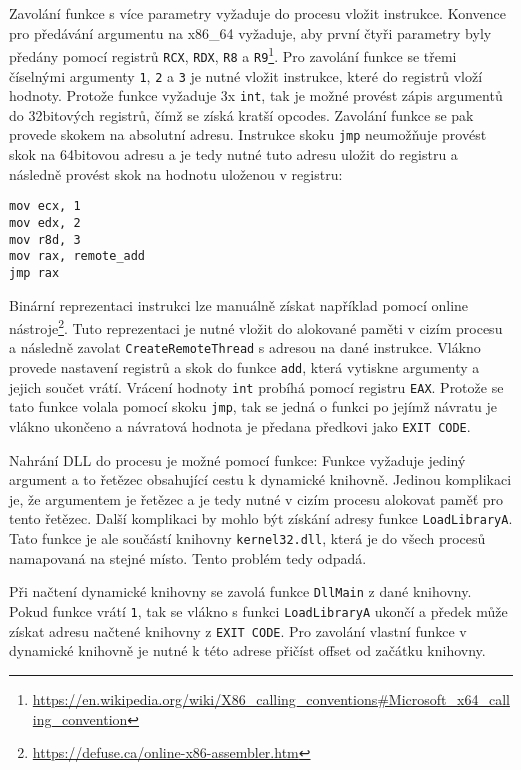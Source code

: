 \documentclass[12pt,a4paper]{article}
\begin{document}
Zavolání funkce s více parametry vyžaduje do procesu vložit instrukce.
Konvence pro předávání argumentu na x86\_64 vyžaduje, aby první čtyři parametry byly předány pomocí registrů \texttt{RCX}, \texttt{RDX}, \texttt{R8} a \texttt{R9}\footnote{\url{https://en.wikipedia.org/wiki/X86_calling_conventions\#Microsoft_x64_calling_convention}}.
Pro zavolání funkce se třemi číselnými argumenty \texttt{1}, \texttt{2} a \texttt{3} je nutné vložit instrukce, které do registrů vloží hodnoty.
Protože funkce vyžaduje 3x \texttt{int}, tak je možné provést zápis argumentů do 32bitových registrů, čímž se získá kratší opcodes.
Zavolání funkce se pak provede skokem na absolutní adresu.
Instrukce skoku \texttt{jmp} neumožňuje provést skok na 64bitovou adresu a je tedy nutné tuto adresu uložit do registru a následně provést skok na hodnotu uloženou v registru: 

\begin{verbatim}
mov ecx, 1
mov edx, 2
mov r8d, 3
mov rax, remote_add
jmp rax
\end{verbatim}

Binární reprezentaci instrukci lze manuálně získat například pomocí online nástroje\footnote{\url{https://defuse.ca/online-x86-assembler.htm}}.
Tuto reprezentaci je nutné vložit do alokované paměti v cizím procesu a následně zavolat \texttt{CreateRemoteThread} s adresou na dané instrukce.
Vlákno provede nastavení registrů a skok do funkce \texttt{add}, která vytiskne argumenty a jejich součet vrátí.
Vrácení hodnoty \texttt{int} probíhá pomocí registru \texttt{EAX}.
Protože se tato funkce volala pomocí skoku \texttt{jmp}, tak se jedná o funkci po jejímž návratu je vlákno ukončeno a návratová hodnota je předana předkovi jako \texttt{EXIT CODE}.

Nahrání DLL do procesu je možné pomocí funkce: 
Funkce vyžaduje jediný argument a to řetězec obsahující cestu k dynamické knihovně.
Jedinou komplikaci je, že argumentem je řetězec a je tedy nutné v cizím procesu alokovat paměť pro tento řetězec.
Další komplikaci by mohlo být získání adresy funkce \texttt{LoadLibraryA}.
Tato funkce je ale součástí knihovny \texttt{kernel32.dll}, která je do všech procesů namapovaná na stejné místo.
Tento problém tedy odpadá.

Při načtení dynamické knihovny se zavolá funkce \texttt{DllMain} z dané knihovny.
Pokud funkce vrátí \texttt{1}, tak se vlákno s funkci \texttt{LoadLibraryA} ukončí a předek může získat adresu načtené knihovny z \texttt{EXIT CODE}.
Pro zavolání vlastní funkce v dynamické knihovně je nutné k této adrese přičíst offset od začátku knihovny.
\end{document}
